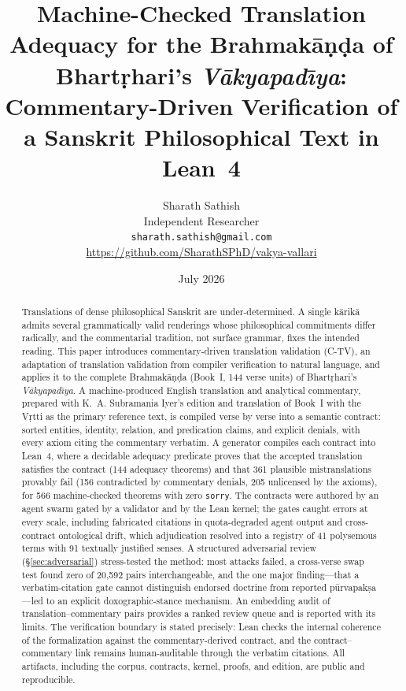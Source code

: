\documentclass[11pt]{article}
\title{Machine-Checked Translation Adequacy for the Brahmak\={a}\d{n}\d{d}a of
  Bhart\d{r}hari's \emph{V\={a}kyapad\={\i}ya}:\\ Commentary-Driven Verification
  of a Sanskrit Philosophical Text in Lean~4}
\author{Sharath Sathish\\
  \small Independent Researcher\\
  \small \texttt{sharath.sathish@gmail.com}\\
  \small \url{https://github.com/SharathSPhD/vakya-vallari}}
\date{July 2026}
\begin{document}
\maketitle

\begin{abstract}
Translations of dense philosophical Sanskrit are under-determined. A single
k\={a}rik\={a} admits several grammatically valid renderings whose
philosophical commitments differ radically, and the commentarial tradition,
not surface grammar, fixes the intended reading. This paper introduces
commentary-driven translation validation (C-TV), an adaptation of translation
validation from compiler verification to natural language, and applies it to
the complete Brahmak\={a}\d{n}\d{d}a (Book~I, 144 verse units) of
Bhart\d{r}hari's \emph{V\={a}kyapad\={\i}ya}. A machine-produced English
translation and analytical commentary, prepared with K.~A. Subramania Iyer's
edition and translation of Book~I with the V\d{r}tti as the primary reference
text, is compiled verse by verse into a semantic contract: sorted entities,
identity, relation, and predication claims, and explicit denials, with every
axiom citing the commentary verbatim. A generator compiles each contract into
Lean~4, where a decidable adequacy predicate proves that the accepted
translation satisfies the contract (144 adequacy theorems) and that 361
plausible mistranslations provably fail (156 contradicted by commentary
denials, 205 unlicensed by the axioms), for 566 machine-checked theorems with
zero \texttt{sorry}. The contracts were authored by an agent swarm gated by a
validator and by the Lean kernel; the gates caught errors at every scale,
including fabricated citations in quota-degraded agent output and
cross-contract ontological drift, which adjudication resolved into a registry
of 41 polysemous terms with 91 textually justified senses. A structured
adversarial review (\S\ref{sec:adversarial}) stress-tested the method: most
attacks failed, a cross-verse swap test found zero of 20{,}592 pairs
interchangeable, and the one major finding---that a verbatim-citation gate
cannot distinguish endorsed doctrine from reported p\={u}rvapak\d{s}a---led to
an explicit doxographic-stance mechanism. An embedding audit of
translation--commentary pairs provides a ranked review queue and is
reported with its limits. The verification boundary is stated precisely: Lean
checks the internal coherence of the formalization against the
commentary-derived contract, and the contract--commentary link remains
human-auditable through the verbatim citations. All artifacts, including the
corpus, contracts, kernel, proofs, and edition, are public and reproducible.
\end{abstract}
\end{document}

